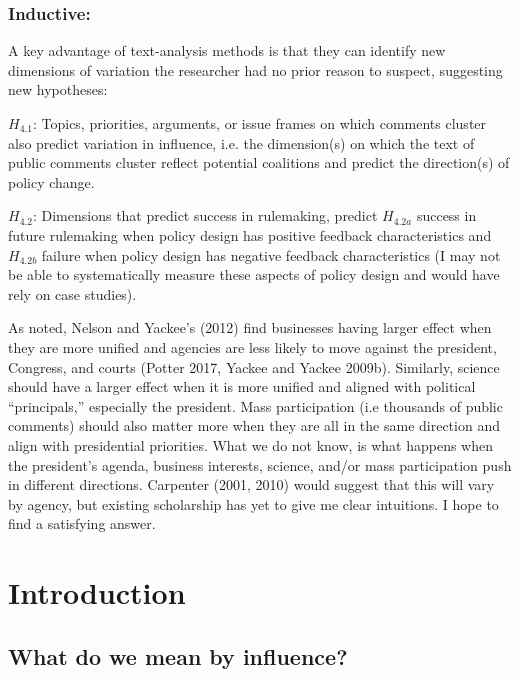 
\subsubsection{Inductive:}

A key advantage of text-analysis methods is that they can identify new dimensions of variation the researcher had no prior reason to suspect, suggesting new hypotheses:

$H_{4.1}$: Topics, priorities, arguments, or issue frames on which comments cluster also predict variation in influence, i.e. the dimension(s) on which the text of public comments cluster reflect potential coalitions and predict the direction(s) of policy change.

$H_{4.2}$: Dimensions that predict success in rulemaking, predict $H_{4.2a}$ success in future rulemaking when policy design has positive feedback characteristics and $H_{4.2b}$ failure when policy design has negative feedback characteristics (I may not be able to systematically measure these aspects of policy design and would have rely on case studies).

As noted, Nelson and Yackee's (2012) find businesses having larger effect when they are more unified and agencies are less likely to move against the president, Congress, and courts (Potter 2017, Yackee and Yackee 2009b). Similarly, science should have a larger effect when it is more unified and aligned with political ``principals,'' especially the president. Mass participation (i.e thousands of public comments) should also matter more when they are all in the same direction and align with presidential priorities. What we do not know, is what happens when the president's agenda, business interests, science, and/or mass participation push in different directions. Carpenter (2001, 2010) would suggest that this will vary by agency, but existing scholarship has yet to give me clear intuitions. I hope to find a satisfying answer. 



\newpage






\tableofcontents
\newpage
\section{Introduction}
\subsection{What do we mean by influence?}
